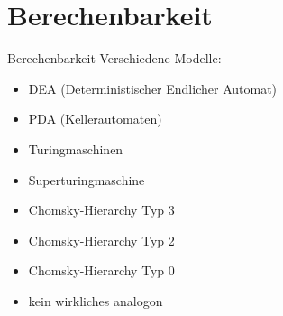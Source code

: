 \section{Berechenbarkeit}


\begin{frame}[c]{Berechenbarkeit}
    \large
    Verschiedene Modelle:
    \begin{multicols}{2}
        \begin{itemize}
             \item DEA (Deterministischer Endlicher Automat)
             \item PDA (Kellerautomaten)
             \item Turingmaschinen
             \item Superturingmaschine
        \end{itemize}
        \begin{itemize}
            \item Chomsky-Hierarchy Typ 3
            \item Chomsky-Hierarchy Typ 2
            \item Chomsky-Hierarchy Typ 0
            \item kein wirkliches analogon
        \end{itemize}
    \end{multicols}
\end{frame}


